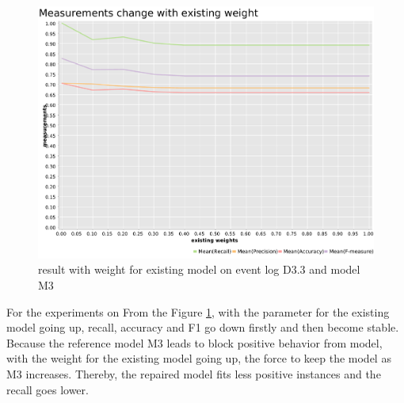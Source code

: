 \begin{figure}[htb]
	\includegraphics[width=\linewidth]{figures/evaluation/M3-D43-ext-weight-plot.pdf}
	\caption{result with weight for existing model on event log D3.3 and model M3}
	\label{fig:ext-weight}
\end{figure} 
For the experiments on From the Figure \ref{fig:ext-weight}, with the parameter for the existing model going up, recall, accuracy and F1 go down firstly and then become stable. Because the reference model M3 leads to block positive behavior from model, with the weight for the existing model going up, the force to keep the model as M3 increases. Thereby, the repaired model fits less positive instances and the recall goes lower. 

